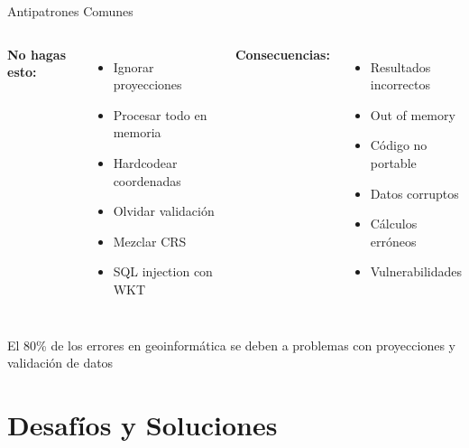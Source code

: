 \documentclass[10pt,aspectratio=169]{beamer}
\newcommand{\alertbox}[1]{
\begin{tcolorbox}[colframe=red!70,colback=red!5]
\centering\faExclamationTriangle\space #1
\end{tcolorbox}
}
\begin{document}
\begin{frame}{Antipatrones Comunes}
    \begin{columns}[T]
        \textbf{\faTimesCircle\space No hagas esto:}
        \begin{itemize}
            \item Ignorar proyecciones
            \item Procesar todo en memoria
            \item Hardcodear coordenadas
            \item Olvidar validación
            \item Mezclar CRS
            \item SQL injection con WKT
        \end{itemize}
        
        \textbf{\faExclamationTriangle\space Consecuencias:}
        \begin{itemize}
            \item Resultados incorrectos
            \item Out of memory
            \item Código no portable
            \item Datos corruptos
            \item Cálculos erróneos
            \item Vulnerabilidades
        \end{itemize}
    \end{columns}
    
    \vspace{0.5cm}
    \alertbox{El 80\% de los errores en geoinformática se deben a problemas con proyecciones y validación de datos}
\end{frame}

\section{Desafíos y Soluciones}
\end{document}
